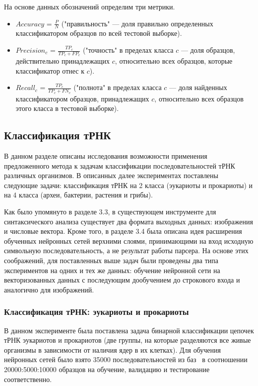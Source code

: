 \documentclass[14pt]{matmex-diploma-custom}
\begin{document}
На основе данных обозначений определим три метрики.
\begin{itemize}
    \item $Accuracy$ = $\frac{P}{N}$ ("правильность" --- доля правильно определенных классификатором образцов по всей тестовой выборке).
    \item $Precision_{c}$ = $\frac{TP_{c}}{TP_{c} + FP_{c}}$ ("точность" в пределах класса $c$ --- доля образцов, действительно принадлежащих $c$, относительно всех образцов, которые классификатор отнес к $c$).
    \item $Recall_{c}$ = $\frac{TP_{c}}{TP_{c} + FN_{c}}$  ("полнота" в пределах класса $c$ --- доля найденных классификатором образцов, принадлежащих $c$, относительно всех образцов этого класса в тестовой выборке).
\end{itemize}

\subsection{Классификация тРНК}
В данном разделе описаны исследования возможности применения предложенного метода к задачам классификации последовательностей тРНК различных организмов. В описанных далее экспериментах поставлены следующие задачи: классификация тРНК на 2 класса (эукариоты и прокариоты) и на 4 класса (археи, бактерии, растения и грибы).

Как было упомянуто в разделе 3.3, в существующем инструменте для синтаксического анализа существует два формата выходных данных: изображения и числовые вектора. Кроме того, в разделе 3.4 была описана идея расширения обученных нейронных сетей верхними слоями, принимающими на вход исходную символьную последовательность, а не результат работы парсера. На основе этих соображений, для поставленных выше задач были проведены два типа экспериментов на одних и тех же данных: обучение нейронной сети на векторизованных данных с последующим дообучением до строкового входа и аналогично для изображений.

\subsubsection{Классификация тРНК: эукариоты и прокариоты}
В данном эксперименте была поставлена задача бинарной классификации цепочек тРНК эукариотов и прокариотов (две группы, на которые разделяются все живые организмы в зависимости от наличия ядер в их клетках). Для обучения нейронных сетей было взято 35000 последовательностей из баз~\cite{trnadb1,trnadb2} в соотношении 20000:5000:10000  образцов на обучение, валидацию и тестирование соответственно.
\end{document}
